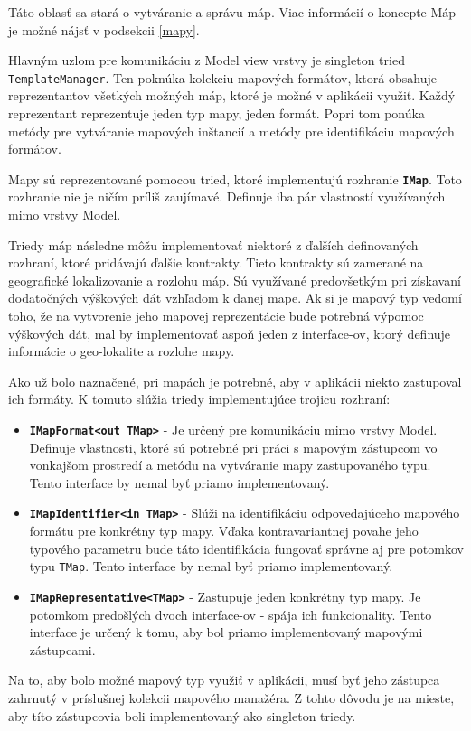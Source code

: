 Táto oblasť sa stará o vytváranie a správu máp. Viac informácií o koncepte Máp je možné nájsť v podsekcii \ref{mapy}.

Hlavným uzlom pre komunikáciu z Model view vrstvy je singleton tried \texttt{TemplateManager}. Ten poknúka kolekciu mapových formátov, ktorá obsahuje reprezentantov všetkých možných máp, ktoré je možné v aplikácii využiť. Každý reprezentant reprezentuje jeden typ mapy, jeden formát. Popri tom ponúka metódy pre vytváranie mapových inštancií a metódy pre identifikáciu mapových formátov. 

\bigskip

Mapy sú reprezentované pomocou tried, ktoré implementujú rozhranie \textbf{\texttt{IMap}}. Toto rozhranie nie je ničím príliš zaujímavé. Definuje iba pár vlastností využívaných mimo vrstvy Model.

Triedy máp následne môžu implementovať niektoré z ďalších definovaných rozhraní, ktoré pridávajú ďalšie kontrakty. Tieto kontrakty sú zamerané na geografické lokalizovanie a rozlohu máp. Sú využívané predovšetkým pri získavaní dodatočných výškových dát vzhľadom k danej mape. Ak si je mapový typ vedomí toho, že na vytvorenie jeho mapovej reprezentácie bude potrebná výpomoc výškových dát, mal by implementovať aspoň jeden z interface-ov, ktorý definuje informácie o geo-lokalite a rozlohe mapy.

Ako už bolo naznačené, pri mapách je potrebné, aby v aplikácii niekto zastupoval ich formáty. K tomuto slúžia triedy implementujúce trojicu rozhraní:
\begin{itemize}
    \item \textbf{\texttt{IMapFormat<out TMap>}} - Je určený pre komunikáciu mimo vrstvy Model. Definuje vlastnosti, ktoré sú potrebné pri práci s mapovým zástupcom vo vonkajšom prostredí a metódu na vytváranie mapy zastupovaného typu. Tento interface by nemal byť priamo implementovaný.
    \item \textbf{\texttt{IMapIdentifier<in TMap>}} - Slúži na identifikáciu odpovedajúceho mapového formátu pre konkrétny typ mapy. Vďaka kontravariantnej povahe jeho typového parametru bude táto identifikácia fungovať správne aj pre potomkov typu \texttt{TMap}. Tento interface by nemal byť priamo implementovaný.
    \item \textbf{\texttt{IMapRepresentative<TMap>}} - Zastupuje jeden konkrétny typ mapy. Je potomkom predošlých dvoch interface-ov - spája ich funkcionality. Tento interface je určený k tomu, aby bol priamo implementovaný mapovými zástupcami.   
\end{itemize}
Na to, aby bolo možné mapový typ využiť v aplikácii, musí byť jeho zástupca zahrnutý v príslušnej kolekcii mapového manažéra. Z tohto dôvodu je na mieste, aby títo zástupcovia boli implementovaný ako singleton triedy.

